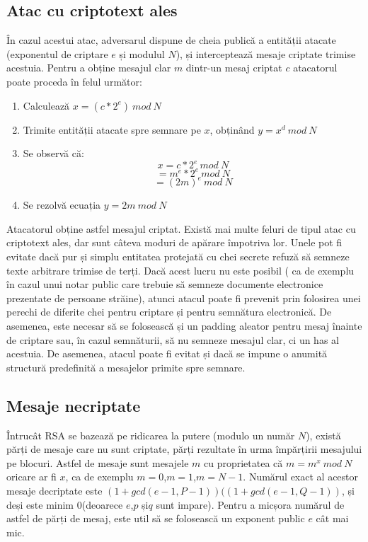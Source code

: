 \documentclass[12]{report}
\begin{document}
\subsection{Atac cu criptotext ales}
În cazul acestui atac, adversarul dispune de cheia publică a entității atacate (exponentul de criptare $e$ și modulul $N$), și interceptează mesaje criptate trimise acestuia. Pentru a obține mesajul clar $m$ dintr-un mesaj criptat $c$ atacatorul poate proceda în felul următor:
\begin{enumerate}
\item Calculează $x=(c * 2^e) \ mod \ N$
\item Trimite entității atacate spre semnare pe $x$, obținând $y=x^d \ mod \ N$
\item Se observă că: 
$$x=c*2^e \ mod \ N $$
$$=m^e * 2^e \ mod \ N$$
$$=(2m)^e \ mod \ N$$ 
\item Se rezolvă ecuația $y=2m \ mod \ N$
\end{enumerate}
Atacatorul obține astfel mesajul criptat. Există mai multe feluri de tipul atac cu criptotext ales, dar sunt câteva moduri de apărare împotriva lor. Unele pot fi evitate dacă pur și simplu entitatea protejată cu chei secrete refuză să semneze texte arbitrare trimise de terți. Dacă acest lucru nu este posibil ( ca de exemplu în cazul unui notar public care trebuie să semneze documente electronice prezentate de persoane străine), atunci atacul poate fi prevenit prin folosirea unei perechi de diferite chei pentru criptare și pentru semnătura electronică. De asemenea, este necesar să se folosească și un padding aleator pentru mesaj înainte de criptare sau, în cazul semnăturii, să nu semneze mesajul clar, ci un has al acestuia. De asemenea, atacul poate fi evitat și dacă se impune o anumită structură predefinită a mesajelor primite spre semnare.
\subsection{Mesaje necriptate}
Întrucât RSA se bazează pe ridicarea la putere (modulo un număr $N$), există părți de mesaje care nu sunt criptate, părți rezultate în urma împărțirii mesajului pe blocuri. Astfel de mesaje sunt mesajele $m$ cu proprietatea că $m=m^x \ mod \ N$ oricare ar fi $x$, ca de exemplu $m=0$,$m=1$,$m=N-1$. Numărul exact al acestor mesaje decriptate este $(1+gcd(e-1,P-1))((1+gcd(e-1,Q-1))$, și deși este minim 0(deoarece $e$,$p$ și$q$ sunt impare). Pentru a micșora numărul de astfel de părți de mesaj, este util să se folosească un exponent public $e$ cât mai mic.
\end{document}
